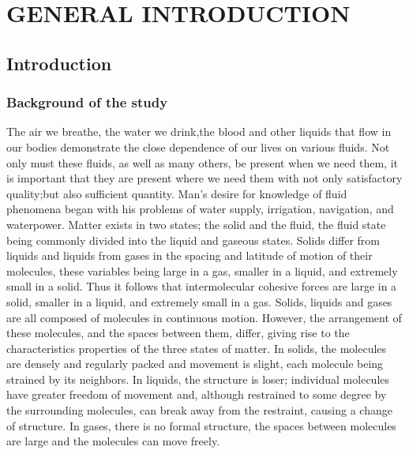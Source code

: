 \documentclass[a4paper,12pt]{report}
\begin{document}
{\tableofcontents
\newpage



\chapter{GENERAL INTRODUCTION}
\section{Introduction}
\subsection{Background of the study}
The air we breathe, the water we drink,the blood and other liquids that flow in our bodies demonstrate the close dependence of our lives on various fluids. Not only must these fluids, as well as many others, be present when we need them, it is important that they are present where we need them with not only satisfactory quality;but also sufficient quantity. Man’s desire for knowledge of fluid phenomena began with his problems of water supply, irrigation, navigation, and waterpower. Matter exists in two states; the solid and the fluid, the fluid state being commonly divided into the liquid and gaseous states. Solids differ from liquids and liquids from gases in the spacing and latitude of motion of their molecules, these variables being large in a gas, smaller in a liquid, and extremely small in a solid. Thus it follows that intermolecular cohesive forces are large in a solid, smaller in a liquid, and extremely small in a gas.
Solids, liquids and gases are all composed of molecules in continuous motion. However, the arrangement of these molecules, and the spaces between them, differ, giving rise to the characteristics properties of the three states of matter. In solids, the molecules are densely and regularly packed and movement is slight, each molecule being strained by its neighbors. In liquids, the structure is loser; individual molecules have greater freedom of movement and, although restrained to some degree by the surrounding molecules, can break away from the restraint, causing a change of structure. In gases, there is no formal structure, the spaces between molecules are large and the molecules can move freely.
}
\end{document}
